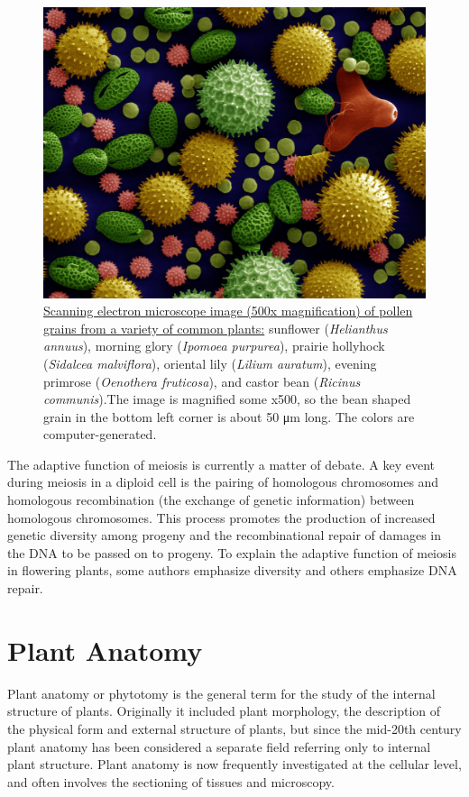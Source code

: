 \begin{figure}

{\centering \includegraphics[width=0.7\linewidth]{./figures/plants/Misc_pollen_colorized} 

}

\caption{\href{https://commons.wikimedia.org/wiki/File:Misc_pollen_colorized.jpg}{Scanning electron microscope image (500x magnification) of pollen grains from a variety of common plants:} sunflower (\emph{Helianthus annuus}), morning glory (\emph{Ipomoea purpurea}), prairie hollyhock (\emph{Sidalcea malviflora}), oriental lily (\emph{Lilium auratum}), evening primrose (\emph{Oenothera fruticosa}), and castor bean (\emph{Ricinus communis}).The image is magnified some x500, so the bean shaped grain in the bottom left corner is about 50 μm long. The colors are computer-generated.}\label{fig:miscpollen}
\end{figure}

The adaptive function of meiosis is currently a matter of debate. A key event during meiosis in a diploid cell is the pairing of homologous chromosomes and homologous recombination (the exchange of genetic information) between homologous chromosomes. This process promotes the production of increased genetic diversity among progeny and the recombinational repair of damages in the DNA to be passed on to progeny. To explain the adaptive function of meiosis in flowering plants, some authors emphasize diversity and others emphasize DNA repair.

\hypertarget{plant-anatomy}{%
\section{Plant Anatomy}\label{plant-anatomy}}

Plant anatomy or phytotomy is the general term for the study of the internal structure of plants. Originally it included plant morphology, the description of the physical form and external structure of plants, but since the mid-20th century plant anatomy has been considered a separate field referring only to internal plant structure. Plant anatomy is now frequently investigated at the cellular level, and often involves the sectioning of tissues and microscopy.

